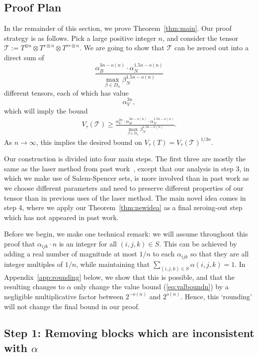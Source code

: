 \PassOptionsToPackage{shortlabels}{enumitem}\documentclass[10pt,a4paper]{article}
\newcommand{\T}{\mathcal{T}}
\begin{document}
\subsection{Proof Plan}
In the remainder of this section, we prove Theorem~\ref{thm:main}. Our proof strategy is as follows. Pick a large positive integer $n$, 
and consider the tensor $\T := T^{\otimes n} \otimes T^{r \otimes n} \otimes T^{rr \otimes n}$. We are going to show that $\T$ can be zeroed out into a direct sum of $$\frac{\alpha_B^{3n - o(n)} \cdot \alpha_N^{1.5n - o(n)}}{\max_{\beta \in D_\alpha} \beta_N^{1.5 n - o(n)}}$$ different tensors, each of which has value $$\alpha_V^{3n},$$ which will imply the bound \begin{align}\label{eq:valboundn}V_\tau(\T) \geq \frac{\alpha_V^{3n} \cdot \alpha_B^{3n - o(n)} \cdot \alpha_N^{1.5n - o(n)}}{\max_{\beta \in D_\alpha} \beta_N^{1.5 n - o(n)}}.\end{align} As $n \to \infty$, this implies the desired bound on $V_\tau(T) = V_\tau(\T)^{1/3n}$.

Our construction is divided into four main steps. The first three are mostly the same as the laser method from past work~\cite{coppersmith,stothers,v12,legall}, except that our analysis in step 3, in which we make use of Salem-Spencer sets, is more involved than in past work as we choose different parameters and need to preserve different properties of our tensor than in previous uses of the laser method. The main novel idea comes in step 4, where we apply our Theorem~\ref{thm:newidea} as a final zeroing-out step which has not appeared in past work.

Before we begin, we make one technical remark: we will assume throughout this proof that $\alpha_{ijk} \cdot n$ is an integer for all $(i,j,k) \in S$. This can be achieved by adding a real number of magnitude at most $1/n$ to each $\alpha_{ijk}$ so that they are all integer multiples of $1/n$, while maintaining that $\sum_{(i,j,k) \in S} \alpha(i,j,k) = 1$. In Appendix~\ref{app:rounding} below, we show that this is possible, and that the resulting changes to $\alpha$ only change the value bound (\ref{eq:valboundn}) by a negligible multiplicative factor between $2^{-o(n)}$ and $2^{o(n)}$. Hence, this `rounding' will not change the final bound in our proof.

\subsection{Step 1: Removing blocks which are inconsistent with \texorpdfstring{$\alpha$}{alpha}}
\end{document}
